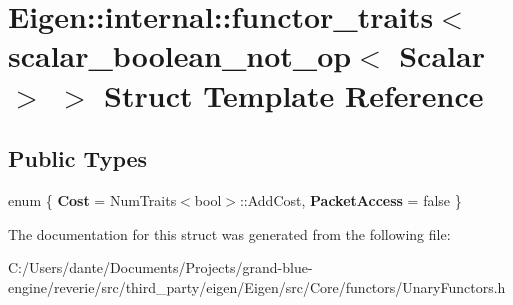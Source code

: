 \hypertarget{struct_eigen_1_1internal_1_1functor__traits_3_01scalar__boolean__not__op_3_01_scalar_01_4_01_4}{}\section{Eigen\+::internal\+::functor\+\_\+traits$<$ scalar\+\_\+boolean\+\_\+not\+\_\+op$<$ Scalar $>$ $>$ Struct Template Reference}
\label{struct_eigen_1_1internal_1_1functor__traits_3_01scalar__boolean__not__op_3_01_scalar_01_4_01_4}
\subsection*{Public Types}
\begin{DoxyCompactItemize}
\item 
\mbox{\label{struct_eigen_1_1internal_1_1functor__traits_3_01scalar__boolean__not__op_3_01_scalar_01_4_01_4_ada35be33f2718381ae2efbfd38084294}} 
enum \{ {\bfseries Cost} = Num\+Traits$<$bool$>$\+::Add\+Cost, 
{\bfseries Packet\+Access} = false
 \}
\end{DoxyCompactItemize}


The documentation for this struct was generated from the following file\+:\begin{DoxyCompactItemize}
\item 
C\+:/\+Users/dante/\+Documents/\+Projects/grand-\/blue-\/engine/reverie/src/third\+\_\+party/eigen/\+Eigen/src/\+Core/functors/Unary\+Functors.\+h\end{DoxyCompactItemize}
